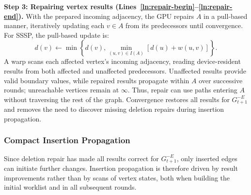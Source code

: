 


\textbf{Step 3: Repairing vertex results (Lines~\ref{ln:repair-begin}--\ref{ln:repair-end}).} With the prepared incoming adjacency, the GPU repairs $A$ in a pull-based manner, iteratively updating each $v\in A$ from its predecessors until convergence. For SSSP, the pull-based update is:
\begin{equation}
d(v)\leftarrow\min\left\{d(v),
\min_{(u,v)\in I(A)}[d(u)+w(u,v)]\right\}.
\label{eq:pull}
\end{equation}
A warp scans each affected vertex's incoming adjacency, reading device-resident results from both affected and unaffected predecessors. Unaffected results provide valid boundary values, while repaired results propagate within $A$ over successive rounds; unreachable vertices remain at $\infty$. Thus, repair can use paths entering $A$ without traversing the rest of the graph. Convergence restores all results for $G_{t+1}^{-E}$ and removes the need to discover missing deletion repairs during insertion propagation.

\subsubsection{Compact Insertion Propagation}
\label{sec:insertion-propagation}
Since deletion repair has made all results correct for $G_{t+1}^{-E}$, only inserted edges can initiate further changes. Insertion propagation is therefore driven by result improvements rather than by scans of vertex states, both when building the initial worklist and in all subsequent rounds.

